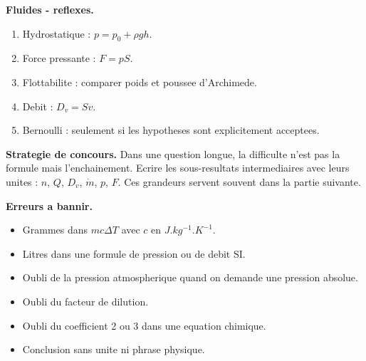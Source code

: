 \documentclass[11pt,a4paper]{article}
\begin{document}
\begin{retenir}
\textbf{Fluides - reflexes.}
\begin{enumerate}
\item Hydrostatique : \(p=p_0+\rho gh\).
\item Force pressante : \(F=pS\).
\item Flottabilite : comparer poids et poussee d'Archimede.
\item Debit : \(D_v=Sv\).
\item Bernoulli : seulement si les hypotheses sont explicitement acceptees.
\end{enumerate}
\end{retenir}

\begin{vigilance}
\textbf{Strategie de concours.} Dans une question longue, la difficulte n'est pas la formule mais l'enchainement. Ecrire les sous-resultats intermediaires avec leurs unites : \(n\), \(Q\), \(D_v\), \(\dot m\), \(p\), \(F\). Ces grandeurs servent souvent dans la partie suivante.
\end{vigilance}

\begin{erreur}
\textbf{Erreurs a bannir.}
\begin{itemize}
\item Grammes dans \(mc\Delta T\) avec \(c\) en \(\si{J.kg^{-1}.K^{-1}}\).
\item Litres dans une formule de pression ou de debit SI.
\item Oubli de la pression atmospherique quand on demande une pression absolue.
\item Oubli du facteur de dilution.
\item Oubli du coefficient 2 ou 3 dans une equation chimique.
\item Conclusion sans unite ni phrase physique.
\end{itemize}
\end{erreur}
\end{document}
